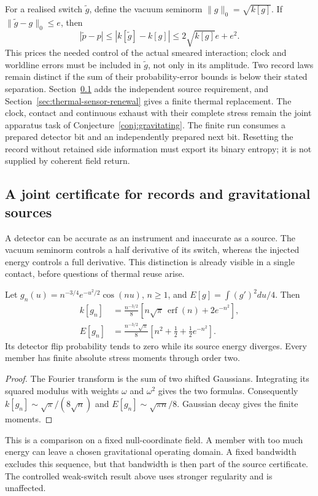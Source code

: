 For a realised switch $\widetilde g$, define the vacuum seminorm
$\|g\|_0=\sqrt{k[g]}$. If $\|\widetilde g-g\|_0\le e$, then
\[
 |\widetilde p-p|\le |k[\widetilde g]-k[g]|
 \le 2\sqrt{k[g]}e+e^2.
\]
This prices the needed control of the actual smeared interaction; clock and
worldline errors must be included in $\widetilde g$, not only in its amplitude.
Two record laws remain distinct if the sum of their probability-error bounds
is below their stated separation. Section~\ref{sec:joint-source-certificate}
adds the independent source requirement, and
Section~\ref{sec:thermal-sensor-renewal} gives a finite thermal replacement.
The clock, contact and continuous exhaust with their complete stress remain
the joint apparatus task of Conjecture~\ref{conj:gravitating}.
The finite run consumes a prepared detector bit and an independently prepared
next bit. Resetting the record without retained side information must export
its binary entropy; it is not supplied by coherent field return.
\subsection{A joint certificate for records and gravitational sources}
\label{sec:joint-source-certificate}

A detector can be accurate as an instrument and inaccurate as a source.
The vacuum seminorm controls a half derivative of its switch, whereas the
injected energy controls a full derivative. This distinction is already
visible in a single contact, before questions of thermal reuse arise.

\begin{proposition}
\label{prop:record-source-gap}
Let $g_n(u)=n^{-3/4}e^{-u^2/2}\cos(nu)$, $n\ge1$, and
$E[g]=\int(g')^2du/4$. Then
\begin{align}
 k[g_n]&=\frac{n^{-3/2}}8
       [n\sqrt\pi\,\operatorname{erf}(n)+2e^{-n^2}],\nonumber\\
 E[g_n]&=\frac{n^{-3/2}\sqrt\pi}8
       [n^2+\tfrac12+\tfrac12e^{-n^2}].
 \label{eq:record-source-counterexample}
\end{align}
Its detector flip probability tends to zero while its source energy diverges.
Every member has finite absolute stress moments through order two.
\end{proposition}
\begin{proof}
The Fourier transform is the sum of two shifted Gaussians. Integrating its
squared modulus with weights $\omega$ and $\omega^2$ gives the two formulas.
Consequently $k[g_n]\sim\sqrt\pi/(8\sqrt n)$ and
$E[g_n]\sim\sqrt{\pi n}/8$. Gaussian decay gives the finite moments.
\end{proof}
This is a comparison on a fixed null-coordinate field. A member with too much
energy can leave a chosen gravitational operating domain. A fixed bandwidth
excludes this sequence, but that bandwidth is then part of the source
certificate. The controlled weak-switch result above uses stronger regularity
and is unaffected.

